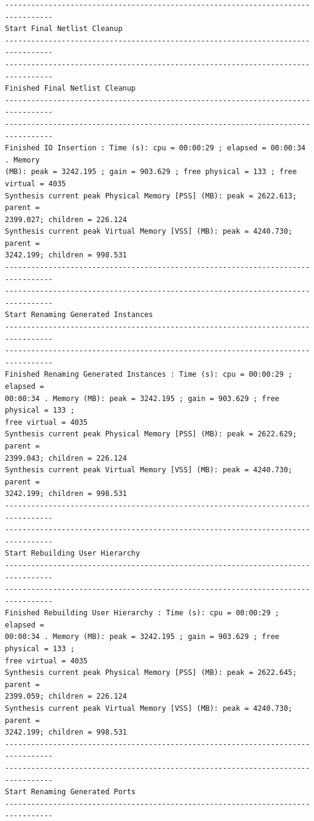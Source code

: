 \documentclass{article}
\begin{document}
\begin{lstlisting}
---------------------------------------------------------------------------------
Start Final Netlist Cleanup
---------------------------------------------------------------------------------
---------------------------------------------------------------------------------
Finished Final Netlist Cleanup
---------------------------------------------------------------------------------
---------------------------------------------------------------------------------
Finished IO Insertion : Time (s): cpu = 00:00:29 ; elapsed = 00:00:34 . Memory 
(MB): peak = 3242.195 ; gain = 903.629 ; free physical = 133 ; free virtual = 4035
Synthesis current peak Physical Memory [PSS] (MB): peak = 2622.613; parent = 
2399.027; children = 226.124
Synthesis current peak Virtual Memory [VSS] (MB): peak = 4240.730; parent = 
3242.199; children = 998.531
---------------------------------------------------------------------------------
---------------------------------------------------------------------------------
Start Renaming Generated Instances
---------------------------------------------------------------------------------
---------------------------------------------------------------------------------
Finished Renaming Generated Instances : Time (s): cpu = 00:00:29 ; elapsed = 
00:00:34 . Memory (MB): peak = 3242.195 ; gain = 903.629 ; free physical = 133 ; 
free virtual = 4035
Synthesis current peak Physical Memory [PSS] (MB): peak = 2622.629; parent = 
2399.043; children = 226.124
Synthesis current peak Virtual Memory [VSS] (MB): peak = 4240.730; parent = 
3242.199; children = 998.531
---------------------------------------------------------------------------------
---------------------------------------------------------------------------------
Start Rebuilding User Hierarchy
---------------------------------------------------------------------------------
---------------------------------------------------------------------------------
Finished Rebuilding User Hierarchy : Time (s): cpu = 00:00:29 ; elapsed = 
00:00:34 . Memory (MB): peak = 3242.195 ; gain = 903.629 ; free physical = 133 ; 
free virtual = 4035
Synthesis current peak Physical Memory [PSS] (MB): peak = 2622.645; parent = 
2399.059; children = 226.124
Synthesis current peak Virtual Memory [VSS] (MB): peak = 4240.730; parent = 
3242.199; children = 998.531
---------------------------------------------------------------------------------
---------------------------------------------------------------------------------
Start Renaming Generated Ports
---------------------------------------------------------------------------------

\end{lstlisting}
\end{document}
